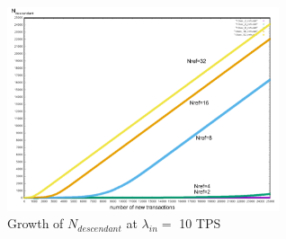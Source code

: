 \documentclass[a4paper,10pt,twocolumn]{article}
\begin{document}
 \begin{figure}[ht]
	\begin{center}
		\includegraphics[width=80mm]{10sec_ref.png}
		\caption{Growth of \(N_{descendant}\) at \( \lambda_{in}=\) 10 TPS}
	  \label{fig:sec10_ref}
	\end{center}
 \end{figure}
 
 
  
\end{document}
